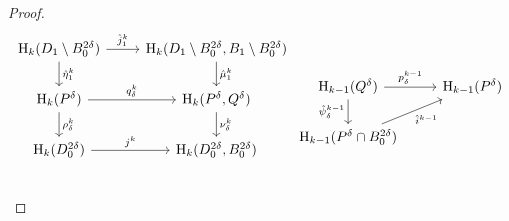 \begin{proof}
\begin{equation}\begin{tikzcd}
    \hom_k(D_1\setminus B_0^{2\delta})\arrow{r}{\hat{j}^k_1}\arrow{d}{\hat{\eta}^k_1} &
    \hom_k(D_1\setminus B_0^{2\delta}, B_1\setminus B_0^{2\delta})\arrow{d}{\hat{\mu}^k_1} \\ %
    \hom_k(P^\delta)\arrow{r}{q^k_\delta} \arrow{d}{\rho^k_\delta} &
    \hom_k(P^\delta, Q^\delta)\arrow{d}{\nu^k_\delta} \\ %
    \hom_k(D_0^{2\delta})\arrow{r}{j^k} & %
    \hom_k(D_0^{2\delta}, B_0^{2\delta}) \\ %
\end{tikzcd}
\begin{tikzcd}
    \hom_{k-1}(Q^\delta)\arrow{r}{p_\delta^{k-1}}\arrow[d, "\hat{\psi}_\delta^{k-1}"'] &
    \hom_{k-1}(P^\delta)\\
    \hom_{k-1}(P^\delta\cap B_0^{2\delta})\arrow[ur, "\hat{i}^{k-1}"']
\end{tikzcd}\end{equation}


\end{proof}
